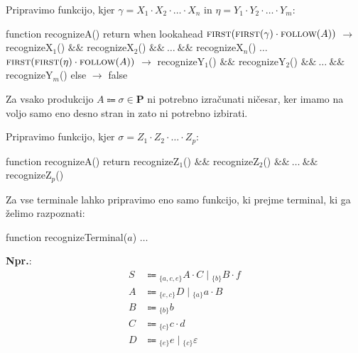\documentclass{report}
\newcommand{\Ex}{\textbf{Npr.}:\ }
\newcommand{\Null}{\varepsilon}
\newcommand{\Seq}{\cdot}
\newcommand{\Union}{\mathrel{|}}
\newcommand{\Set}[1]{\symbf{#1}}
\newcommand{\FIRST}{\textsc{first}}
\newcommand{\FOLLOW}{\textsc{follow}}
\newcommand{\Productions}{\Set{P}}
\newcommand{\Arrow}{\Coloneq}
\newlength{\arrow}
\newcommand{\NT}[1]{{#1}}
\newcommand{\T}[1]{{#1}}
\newcommand{\Sym}[1]{{#1}}
\newcommand{\Lookahead}[1]{{}_{\{{#1}\}}}
\begin{document}
      Pripravimo funkcijo, kjer $\gamma = \Sym{X}_1 \Seq \Sym{X}_2 \Seq \dots \Seq \Sym{X}_n$ in $\eta = \Sym{Y}_1 \Seq \Sym{Y}_2 \Seq \dots \Seq \Sym{Y}_m$:

      \begin{algorithm}
        function recognizeA()
          return when lookahead
            $\FIRST(\FIRST(\gamma) \Seq \FOLLOW(\NT{A}))$ $\rightarrow$ recognizeX$_1$() $\&\&$ recognizeX$_2$() $\&\&\ \dots\ \&\&$ recognizeX$_n$()
            $\dots$
            $\FIRST(\FIRST(\eta) \Seq \FOLLOW(\NT{A}))$ $\rightarrow$ recognizeY$_1$() $\&\&$ recognizeY$_2$() $\&\&\ \dots\ \&\&$ recognizeY$_m$()
            else $\rightarrow$ false
      \end{algorithm}

      Za vsako produkcijo $A \Arrow \sigma \in \Productions$ ni potrebno izračunati ničesar, ker imamo na voljo samo eno desno stran in zato ni potrebno izbirati.

      Pripravimo funkcijo, kjer $\sigma = \NT{Z}_1 \Seq \NT{Z}_2 \Seq \dots \Seq \NT{Z}_p$:

      \begin{algorithm}
        function recognizeA()
          return recognizeZ$_1$() $\&\&$ recognizeZ$_2$() $\&\&\ \dots\ \&\&$ recognizeZ$_p$()
      \end{algorithm}

      Za vse terminale lahko pripravimo eno samo funkcijo, ki prejme terminal, ki ga želimo razpoznati:
      \begin{algorithm}
        function recognizeTerminal($a$)
          $\dots$
      \end{algorithm}

      \Ex
      \begin{equation*}
        \begin{aligned}
          \NT{S} &\Arrow \Lookahead{\T{a}, \T{c}, \T{e}} \NT{A} \Seq \NT{C} \Union \Lookahead{\T{b}} \NT{B} \Seq \T{f} \\
          \NT{A} &\Arrow \Lookahead{\T{e}, \T{c}} \NT{D} \Union \Lookahead{\T{a}} \T{a} \Seq \NT{B} \\
          \NT{B} &\Arrow \Lookahead{\T{b}} \T{b}\\
          \NT{C} &\Arrow \Lookahead{\T{c}} \T{c} \Seq \T{d}\\
          \NT{D} &\Arrow \Lookahead{\T{e}} \T{e} \Union \Lookahead{\T{c}} \Null
        \end{aligned}
      \end{equation*}
\end{document}
